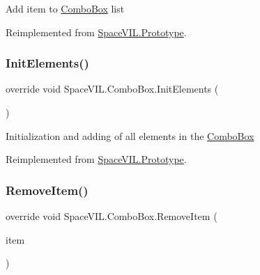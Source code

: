 Add item to \mbox{\hyperlink{class_space_v_i_l_1_1_combo_box}{Combo\+Box}} list 



Reimplemented from \mbox{\hyperlink{class_space_v_i_l_1_1_prototype}{Space\+V\+I\+L.\+Prototype}}.

\mbox{\label{class_space_v_i_l_1_1_combo_box_af43d1181237882f92c25cf60cb67233a}} 
\subsubsection{\texorpdfstring{Init\+Elements()}{InitElements()}}
{\footnotesize\ttfamily override void Space\+V\+I\+L.\+Combo\+Box.\+Init\+Elements (\begin{DoxyParamCaption}{ }\end{DoxyParamCaption})\hspace{0.3cm}{\ttfamily [virtual]}}



Initialization and adding of all elements in the \mbox{\hyperlink{class_space_v_i_l_1_1_combo_box}{Combo\+Box}} 



Reimplemented from \mbox{\hyperlink{class_space_v_i_l_1_1_prototype_ac3379fe02923ee155b5b0084abf27420}{Space\+V\+I\+L.\+Prototype}}.

\mbox{\label{class_space_v_i_l_1_1_combo_box_a646108f1b822d481ae32b68e7bd3f44f}} 
\subsubsection{\texorpdfstring{Remove\+Item()}{RemoveItem()}}
{\footnotesize\ttfamily override void Space\+V\+I\+L.\+Combo\+Box.\+Remove\+Item (\begin{DoxyParamCaption}\item[{\mbox{\hyperlink{interface_space_v_i_l_1_1_core_1_1_i_base_item}{I\+Base\+Item}}}]{item }\end{DoxyParamCaption})\hspace{0.3cm}{\ttfamily [virtual]}}



